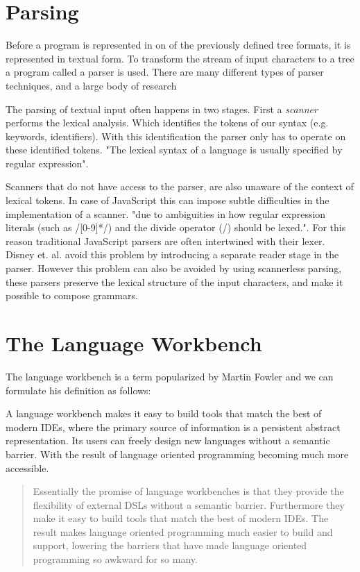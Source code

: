 \section{Parsing}
Before a program is represented in on of the previously defined tree formats, it is represented in textual form. To transform the stream of input characters to a tree a program called a parser is used. There are many different types of parser techniques, and a large body of research\cite{Visser1997,Brand2002,Salomon1989}

The parsing of textual input often happens in two stages. First a \textit{scanner} performs the lexical analysis. Which identifies the tokens of our syntax (e.g. keywords, identifiers). With this identification the parser only has to operate on these identified tokens. "The lexical syntax of a language is usually specified by regular expression"\cite{Bravenboer2004}.

Scanners that do not have access to the parser, are also unaware of the context of lexical tokens. In case of JavaScript this can impose subtle difficulties in the implementation of a scanner. "due to ambiguities in how regular expression literals (such as /[0-9]*/) and the divide operator (/) should be lexed."\cite{Disney2014}. For this reason traditional JavaScript parsers are often intertwined with their lexer. Disney et. al. avoid this problem by introducing a separate reader stage in the parser. However this problem can also be avoided by using scannerless parsing, these parsers preserve the lexical structure of the input characters, and make it possible to compose grammars\cite{Visser1997}.  

\section{The Language Workbench} \label{rascal}

The language workbench is a term popularized by Martin Fowler and we can formulate his definition as follows:

A language workbench makes it easy to build tools that match the best of modern IDEs, where the primary source of information is a persistent abstract representation. Its users can freely design new languages without a semantic barrier. With the result of language oriented programming becoming much more accessible.\cite{Fowler2005}

\blockquote[\cite{Fowler2005}]{Essentially the promise of language workbenches is that they provide the flexibility of external DSLs without a semantic barrier. Furthermore they make it easy to build tools that match the best of modern IDEs. The result makes language oriented programming much easier to build and support, lowering the barriers that have made language oriented programming so awkward for so many.}

